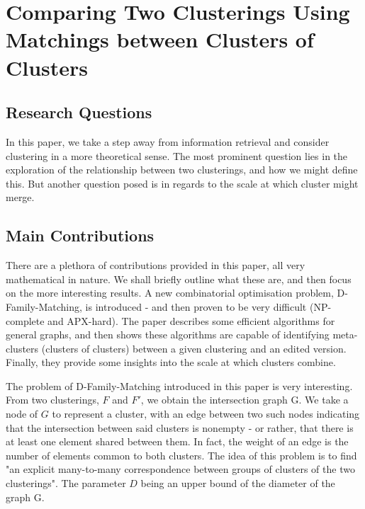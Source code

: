 \documentclass[sigconf,authorversion,nonacm]{acmart}
\begin{document}
\section{Comparing Two Clusterings Using Matchings between Clusters of Clusters}
\subsection{Research Questions}
In this paper, we take a step away from information retrieval and consider clustering in a more theoretical sense. The most prominent question lies in the exploration of the relationship between two clusterings, and how we might define this. But another question posed is in regards to the scale at which cluster might merge.
\subsection{Main Contributions}
There are a plethora of contributions provided in this paper, all very mathematical in nature. We shall briefly outline what these are, and then focus on the more interesting results. A new combinatorial optimisation problem, D-Family-Matching, is introduced - and then proven to be very difficult (NP-complete and APX-hard). The paper describes some efficient algorithms for general graphs, and then shows these algorithms are capable of identifying meta-clusters (clusters of clusters) between a given clustering and an edited version. Finally, they provide some insights into the scale at which clusters combine.

The problem of D-Family-Matching introduced in this paper is very interesting. From two clusterings, $F$ and $F'$, we obtain the intersection graph G. We take a node of $G$ to represent a cluster, with an edge between two such nodes indicating that the intersection between said clusters is nonempty - or rather, that there is at least one element shared between them. In fact, the weight of an edge is the number of elements common to both clusters. The idea of this problem is to find "an explicit many-to-many correspondence between groups of clusters of the two clusterings"\cite{Cazals2019}. The parameter $D$ being an upper bound of the diameter of the graph G.
\end{document}
